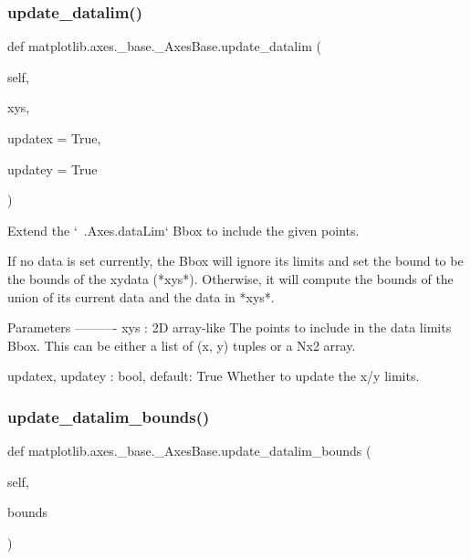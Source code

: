 \subsubsection{\texorpdfstring{update\+\_\+datalim()}{update\_datalim()}}
{\footnotesize\ttfamily def matplotlib.\+axes.\+\_\+base.\+\_\+\+Axes\+Base.\+update\+\_\+datalim (\begin{DoxyParamCaption}\item[{}]{self,  }\item[{}]{xys,  }\item[{}]{updatex = {\ttfamily True},  }\item[{}]{updatey = {\ttfamily True} }\end{DoxyParamCaption})}

\begin{DoxyVerb}Extend the `~.Axes.dataLim` Bbox to include the given points.

If no data is set currently, the Bbox will ignore its limits and set
the bound to be the bounds of the xydata (*xys*). Otherwise, it will
compute the bounds of the union of its current data and the data in
*xys*.

Parameters
----------
xys : 2D array-like
    The points to include in the data limits Bbox. This can be either
    a list of (x, y) tuples or a Nx2 array.

updatex, updatey : bool, default: True
    Whether to update the x/y limits.
\end{DoxyVerb}
 \mbox{\label{classmatplotlib_1_1axes_1_1__base_1_1__AxesBase_a0832c48eed25452df95baae0fef9e208}} 
\subsubsection{\texorpdfstring{update\+\_\+datalim\+\_\+bounds()}{update\_datalim\_bounds()}}
{\footnotesize\ttfamily def matplotlib.\+axes.\+\_\+base.\+\_\+\+Axes\+Base.\+update\+\_\+datalim\+\_\+bounds (\begin{DoxyParamCaption}\item[{}]{self,  }\item[{}]{bounds }\end{DoxyParamCaption})}

